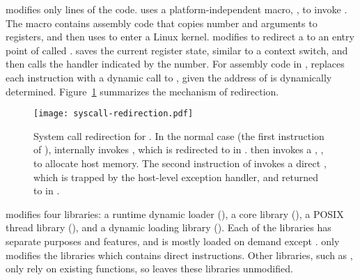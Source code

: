 \graphene{} modifies only \gipclines{} lines of the \glibc{} code.
\glibc{} uses a platform-independent macro,
,
to invoke \linuxapis{}.
The macro  contains assembly code
that copies \linuxapi{} number and arguments to registers,
and then uses  to enter a Linux kernel.
\graphene{} modifies 
to redirect a \linuxapi{} to
an entry point of \thelibos{} called .
 saves the current register state, similar to a context switch,
and then
calls the \linuxapi{} handler
indicated by the \linuxapi{} number.
For assembly code in \glibc{},
\graphene{} replaces each  instruction with
a dynamic call to
, given the address of  is dynamically determined.
Figure~\ref{fig:libos:syscall-redirection} summarizes the mechanism of \linuxapi{} redirection.


\begin{figure}[t!]
\centering
\texttt{[image: syscall-redirection.pdf]}
\footnotesize
\caption{System call redirection for \thelibos{}.
In the normal case (the first instruction of ),  internally invokes 
, which is redirected to  in \thelibos{}.\thelibos{} then invokes a \hostapi{}, , to allocate host memory. The second instruction of  invokes a direct \linuxapi{}, which is trapped by the host-level exception handler,
and returned to  in \thelibos{}.}
\label{fig:libos:syscall-redirection}
\end{figure}


\graphene{} modifies four \glibc{} libraries:
a runtime dynamic loader (), a core library (), a POSIX thread library (\libpthread{}), and a dynamic loading library (\libdl{}).
Each of the \Glibc{} libraries has separate purposes and features,
and is mostly loaded on demand except .
\graphene{} only modifies the \glibc{} libraries which contains direct  instructions.
Other libraries, such as ,
only rely on 
existing \libc{} functions,
so \graphene{} leaves these libraries unmodified.



